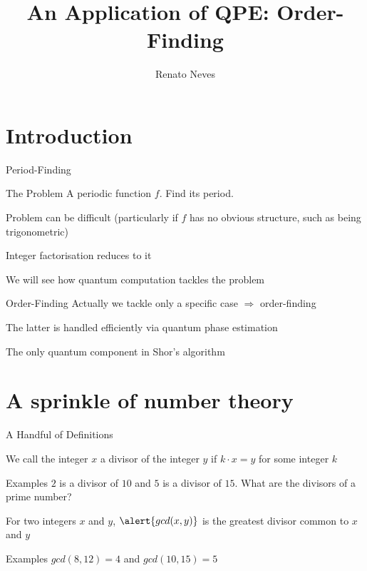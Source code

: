 \documentclass{beamer}
\author[Renato Neves]{Renato Neves}
\date{}
\begin{document}
\title{An Application of QPE: Order-Finding}

\frame[plain]{\titlepage}

\section{Introduction}

\begin{frame}{Period-Finding}

        \begin{block}{The Problem}
                A \alert{periodic} function $f$. Find its period.
        \end{block}

        \pause
        Problem can be difficult (particularly if $f$ has no obvious
        structure, such as being trigonometric)

        \alert{Integer factorisation} reduces to it 

        We will see how quantum computation tackles the problem
\end{frame}

\begin{frame}{Order-Finding}
        Actually we tackle only a specific
        case $\Rightarrow$  \alert{order-finding}

        The latter is handled efficiently via quantum phase estimation

        The only quantum component in Shor's algorithm
\end{frame}

\section{A sprinkle of number theory}

\begin{frame}{A Handful of Definitions}

        \begin{definition}
                We call the integer $x$ a \alert{divisor} of the 
                integer $y$ if $k \cdot x = y$ for some integer $k$
        \end{definition}

        \begin{block}{Examples}
                $2$ is a divisor of $10$ and $5$ is a divisor of $15$. What are
                the divisors of a prime number?
        \end{block}

        \begin{definition}
                For two integers $x$ and $y$, $\alert{gcd(x,y)}$ is the
                greatest divisor common to $x$ and $y$
        \end{definition}

        \begin{block}{Examples}
                $gcd(8,12) = 4$ and $gcd(10,15) = 5$
        \end{block}
\end{frame}
\end{document}
